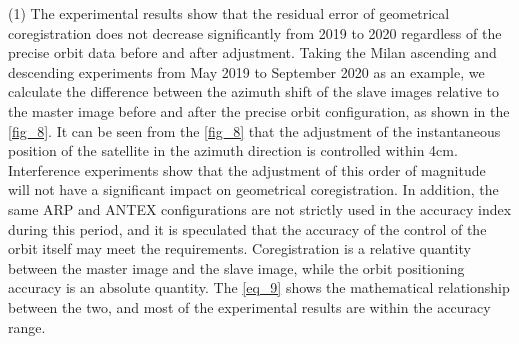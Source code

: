 \documentclass[preprint, authoryear]{elsarticle}
\begin{document}
(1) The experimental results show that the residual error of geometrical coregistration does not decrease significantly from 2019 to 2020 regardless of the precise orbit data before and after adjustment. Taking the Milan ascending and descending experiments from May 2019 to September 2020 as an example, we calculate the difference between the azimuth shift of the slave images relative to the master image before and after the precise orbit configuration, as shown in the \ref{fig_8}. It can be seen from the \ref{fig_8} that the adjustment of the instantaneous position of the satellite in the azimuth direction is controlled within 4cm. Interference experiments show that the adjustment of this order of magnitude will not have a significant impact on geometrical coregistration. In addition, the same ARP and ANTEX configurations are not strictly used in the accuracy index during this period, and it is speculated that the accuracy of the control of the orbit itself may meet the requirements. Coregistration is a relative quantity between the master image and the slave image, while the orbit positioning accuracy is an absolute quantity. The \ref{eq_9} shows the mathematical relationship between the two, and most of the experimental results are within the accuracy range. \par
\end{document}
